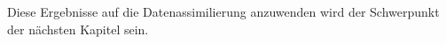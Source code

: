 
Diese Ergebnisse auf die Datenassimilierung anzuwenden wird der Schwerpunkt der nächsten Kapitel sein.
